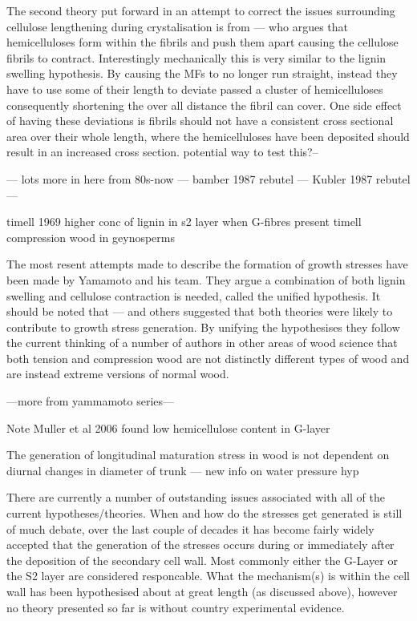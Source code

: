 \documentclass{article}
\begin{document}
The second theory put forward in an attempt to correct the issues surrounding
cellulose lengthening during crystalisation is from --- who argues that
hemicelluloses form within the fibrils and push them apart causing the
cellulose fibrils to contract. Interestingly mechanically this is very similar
to the lignin swelling hypothesis. By causing the MFs to no longer run straight,
instead they have to use some of their length to deviate passed a cluster of
hemicelluloses consequently shortening the over all distance the fibril can
cover. One side effect of having these deviations is fibrils should not have a
consistent cross sectional area over their whole length, where the
hemicelluloses have been deposited should result in an increased cross section.
potential way to test this?--

--- lots more in here from 80s-now ---
bamber 1987 rebutel ---
Kubler 1987 rebutel ---

timell 1969 higher conc of lignin in s2 layer when G-fibres present
timell compression wood in geynosperms

The most resent attempts made to describe the formation of growth stresses have
been made by Yamamoto and his team. They argue a combination of both lignin
swelling and cellulose contraction is needed, called the unified hypothesis. It
should be noted that --- and others suggested that both theories were likely to
contribute to growth stress generation. By unifying the hypothesises they follow
the current thinking of a number of authors in other areas of wood science that
both tension and compression wood are not distinctly different types of wood and
are instead extreme versions of normal wood.

---more from yammamoto series---

Note Muller et al 2006 found low hemicellulose content in G-layer

The generation of longitudinal maturation stress in wood is not dependent on
diurnal changes in diameter of trunk --- new info on water pressure hyp

There are currently a number of outstanding issues associated with all
of the current hypotheses/theories. When and how do the stresses get
generated is still of much debate, over the last couple of decades it has become
fairly widely accepted that the generation of the stresses occurs during or
immediately after the deposition of the secondary cell wall. Most commonly either
the G-Layer or the S2 layer are considered responcable. What the mechanism(s)
is within the cell wall has been hypothesised about at great length (as
discussed above), however no theory presented so far is without country
experimental evidence.
\end{document}
